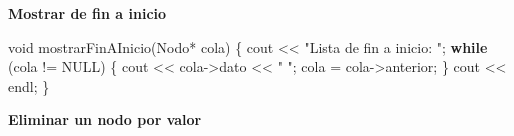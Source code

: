 \documentclass[
  11pt,
  a4paper,
  DIV=11,
  numbers=noendperiod]{scrreprt}
\newenvironment{Shaded}{\begin{snugshade}}{\end{snugshade}}
\newcommand{\ControlFlowTok}[1]{\textcolor[rgb]{0.00,0.23,0.31}{\textbf{#1}}}
\newcommand{\DataTypeTok}[1]{\textcolor[rgb]{0.68,0.00,0.00}{#1}}
\newcommand{\NormalTok}[1]{\textcolor[rgb]{0.00,0.23,0.31}{#1}}
\newcommand{\OperatorTok}[1]{\textcolor[rgb]{0.37,0.37,0.37}{#1}}
\newcommand{\StringTok}[1]{\textcolor[rgb]{0.13,0.47,0.30}{#1}}
\begin{document}
\textbf{Mostrar de fin a inicio}

\begin{Shaded}
\begin{Highlighting}[]
\DataTypeTok{void}\NormalTok{ mostrarFinAInicio}\OperatorTok{(}\NormalTok{Nodo}\OperatorTok{*}\NormalTok{ cola}\OperatorTok{)} \OperatorTok{\{}
\NormalTok{    cout }\OperatorTok{\textless{}\textless{}} \StringTok{"Lista de fin a inicio: "}\OperatorTok{;}
    \ControlFlowTok{while} \OperatorTok{(}\NormalTok{cola }\OperatorTok{!=}\NormalTok{ NULL}\OperatorTok{)} \OperatorTok{\{}
\NormalTok{        cout }\OperatorTok{\textless{}\textless{}}\NormalTok{ cola}\OperatorTok{{-}\textgreater{}}\NormalTok{dato }\OperatorTok{\textless{}\textless{}} \StringTok{" "}\OperatorTok{;}
\NormalTok{        cola }\OperatorTok{=}\NormalTok{ cola}\OperatorTok{{-}\textgreater{}}\NormalTok{anterior}\OperatorTok{;}
    \OperatorTok{\}}
\NormalTok{    cout }\OperatorTok{\textless{}\textless{}}\NormalTok{ endl}\OperatorTok{;}
\OperatorTok{\}}
\end{Highlighting}
\end{Shaded}

\textbf{Eliminar un nodo por valor}
\end{document}

